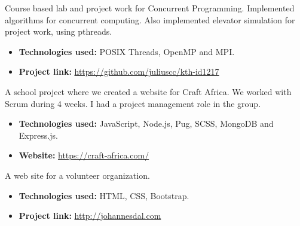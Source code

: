 \divider


Course based lab and project work for Concurrent Programming. Implemented algorithms for concurrent computing. Also implemented elevator simulation for project work, using pthreads.

\vspace{6pt}

\begin{itemize}
    \item \textbf{Technologies used:} POSIX Threads, OpenMP and MPI.
    \item \textbf{Project link:} \href{https://github.com/juliuscc/kth-id1217}{https://github.com/juliuscc/kth-id1217}
\end{itemize}

\divider


A school project where we created a website for Craft Africa. We worked with Scrum during 4 weeks. I had a project management role in the group.

\vspace{6pt}

\begin{itemize}
    \item \textbf{Technologies used:} JavaScript, Node.js, Pug, SCSS, MongoDB and Express.js.
    \item \textbf{Website:} \href{https://craft-africa.com/}{https://craft-africa.com/}
\end{itemize}

\divider

A web site for a volunteer organization.

\vspace{6pt}

\begin{itemize}
    \item \textbf{Technologies used:} HTML, CSS, Bootstrap.
    \item \textbf{Project link:} \href{http://johannesdal.com}{http://johannesdal.com}
\end{itemize}
